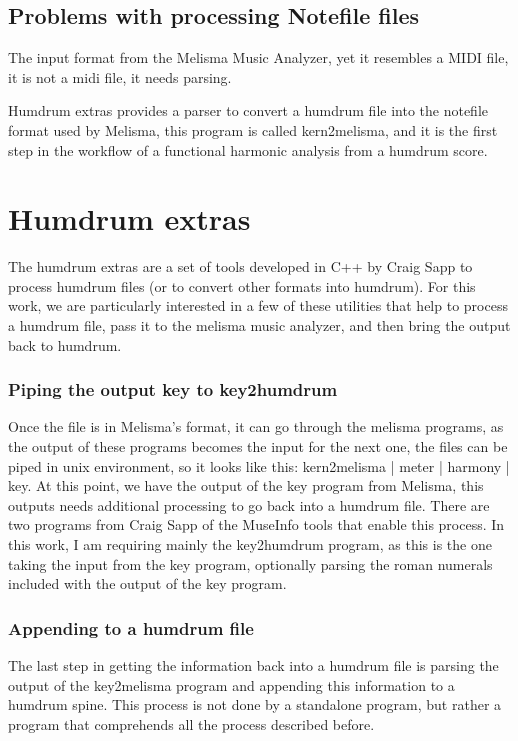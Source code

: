   \subsection{Problems with processing Notefile files}
    The input format from the Melisma Music Analyzer, yet it resembles a MIDI file, it is not a midi file, it needs parsing.


    Humdrum extras provides a parser to convert a humdrum file into the notefile format used by Melisma, this program is called kern2melisma, and it is the first step in the workflow of a functional harmonic analysis from a humdrum score.
\section{Humdrum extras}
  The humdrum extras are a set of tools developed in C++ by Craig Sapp to process humdrum files (or to convert other formats into humdrum). For this work, we are particularly interested in a few of these utilities that help to process a humdrum file, pass it to the melisma music analyzer, and then bring the output back to humdrum.

  \subsubsection{Piping the output key to key2humdrum}
    Once the file is in Melisma's format, it can go through the melisma programs, as the output of these programs becomes the input for the next one, the files can be piped in unix environment, so it looks like this: kern2melisma | meter | harmony | key.
    At this point, we have the output of the key program from Melisma, this outputs needs additional processing to go back into a humdrum file. There are two programs from Craig Sapp of the MuseInfo tools that enable this process. In this work, I am requiring mainly the key2humdrum program, as this is the one taking the input from the key program, optionally parsing the roman numerals included with the output of the key program.
  \subsubsection{Appending to a humdrum file}
    The last step in getting the information back into a humdrum file is parsing the output of the key2melisma program and appending this information to a humdrum spine. This process is not done by a standalone program, but rather a program that comprehends all the process described before.


